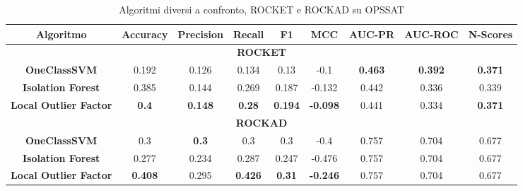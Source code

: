 \begin{table}[h!]
    \centering %
    \begin{adjustbox}{max width=\textwidth}
        \begin{tabular}{|c|c|c|c|c|c|c|c|c|}
        \hline
        \textbf{Algoritmo} & \textbf{Accuracy} &\textbf{Precision}  & \textbf{Recall} & \textbf{F1} & \textbf{MCC} & \textbf{AUC-PR} & \textbf{AUC-ROC} & \textbf{N-Scores}\\
        \hline
        \multicolumn{9}{|c|}{\textbf{ROCKET}} \\
        \hline
         \textbf{OneClassSVM} & 0.192 & 0.126 & 0.134 &0.13  & -0.1 & \textbf{0.463}& \textbf{0.392}& \textbf{0.371}\\
        \hline
        \textbf{Isolation Forest} & 0.385 & 0.144 & 0.269 &0.187  & -0.132 & 0.442& 0.336&0.339 \\
        \hline
        \textbf{Local Outlier Factor} & \textbf{0.4} & \textbf{0.148} &\textbf{ 0.28} &\textbf{0.194}  & \textbf{-0.098} & 0.441& 0.334&\textbf{0.371} \\
        \hline
        \multicolumn{9}{|c|}{\textbf{ROCKAD}} \\
        \hline
         \textbf{OneClassSVM} & 0.3 & \textbf{0.3} & 0.3 &0.3  & -0.4 & 0.757& 0.704 &0.677\\
        \hline
        \textbf{Isolation Forest} & 0.277 & 0.234 & 0.287 &0.247  & -0.476 & 0.757& 0.704&0.677 \\
        \hline
        \textbf{Local Outlier Factor} & \textbf{0.408} & 0.295 & \textbf{0.426} &\textbf{0.31}  & \textbf{-0.246} & 0.757& 0.704&0.677\\
        \hline
        \end{tabular}
    \end{adjustbox}
    \caption{Algoritmi diversi a confronto, ROCKET e ROCKAD su OPS\textunderscore SAT}
    \label{tab:AlgoritmiVari_OPS_SAT}
\end{table}
